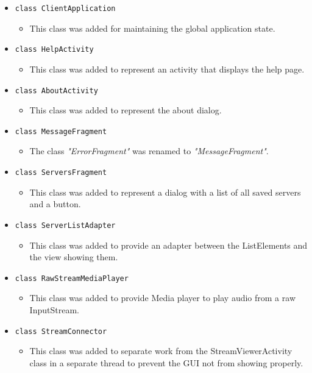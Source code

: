 \documentclass[a4paper,10pt]{scrartcl}
\begin{document}
\begin{itemize}
    \item \lstinline|class ClientApplication|
  \begin{itemize}
   \item This class was added for maintaining the global application state.
  \end{itemize}

  \item \lstinline|class HelpActivity|
  \begin{itemize}
   \item This class was added to represent an activity that displays the help page.
  \end{itemize}

  \item \lstinline|class AboutActivity|
  \begin{itemize}
   \item This class was added to represent the about dialog.
  \end{itemize}

   \item \lstinline|class MessageFragment|
  \begin{itemize}
   \item The class \textit{"ErrorFragment"} was renamed to \textit{"MessageFragment"}.
  \end{itemize}

  \item \lstinline|class ServersFragment|
  \begin{itemize}
   \item This class was added to represent a dialog with a list of all saved servers and a button.
  \end{itemize}

  \item \lstinline|class ServerListAdapter|
  \begin{itemize}
  \item This class was added to provide an adapter between the ListElements and the view showing them.
  \end{itemize}

  \item \lstinline|class RawStreamMediaPlayer|
  \begin{itemize}
  \item This class was added to provide Media player to play audio from a raw InputStream.
  \end{itemize}

    \item \lstinline|class StreamConnector|
  \begin{itemize}
   \item This class was added to separate work from the StreamViewerActivity class
  in a separate thread to prevent the GUI not from showing properly.
  \end{itemize}

\end{itemize}
\end{document}
